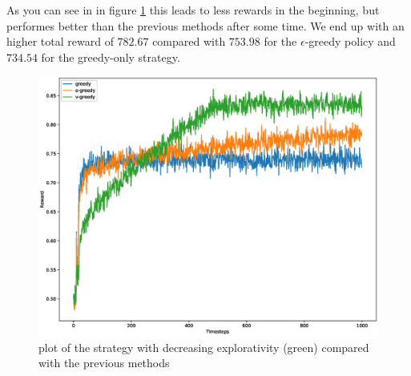 \documentclass[11pt,a4paper]{article}
\begin{document}
\flushleft As you can see in in figure \ref{fig2} this leads to less rewards in the beginning, but performes better
than the previous methods after some time. We end up with an higher total reward of $782.67$ compared with $753.98$ for the
$\epsilon$-greedy policy and $734.54$ for the greedy-only strategy.

\begin{figure}[h!]
    \includegraphics[width=.7\textwidth]{fig_experimental_3.eps}
    \centering
    \caption{plot of the strategy with decreasing explorativity (green) compared with the previous methods}
    \label{fig2}
\end{figure}
\end{document}
